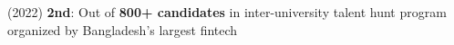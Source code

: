 (2022) \textbf{2nd}{: Out of \textbf{800+ candidates} in inter-university talent hunt program organized by Bangladesh's largest fintech} \\
